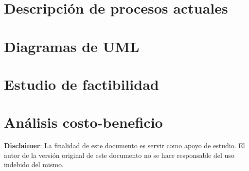 \documentclass{article}
\begin{document}
\section{Descripción de procesos actuales}

\section{Diagramas de UML}

\section{Estudio de factibilidad}

\section{Análisis costo-beneficio}

\textbf{Disclaimer}: La finalidad de este documento es servir como apoyo de estudio.
El autor de la versión original de este documento no se hace responsable del
uso indebido del mismo.
\end{document}
